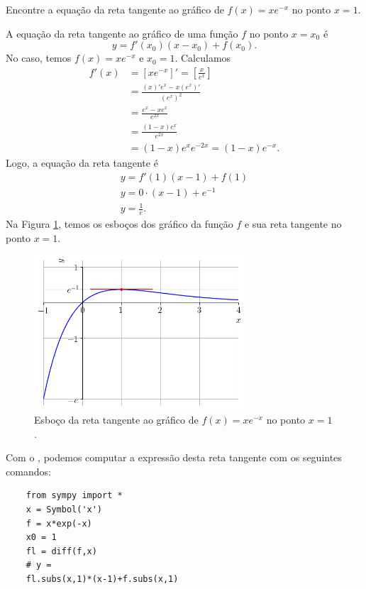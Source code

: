 \begin{exeresol}
  Encontre a equação da reta tangente ao gráfico de $f(x) = xe^{-x}$ no ponto $x=1$.
\end{exeresol}
\begin{resol}
  A equação da reta tangente ao gráfico de uma função $f$ no ponto $x=x_0$ é
  \begin{equation}
    y = f'(x_0)(x-x_0)+f(x_0).
  \end{equation}
  No caso, temos $f(x)=xe^{-x}$ e $x_0=1$. Calculamos
  \begin{align}
    f'(x) &= [xe^{-x}]' = \left[\frac{x}{e^x}\right] \\
          &= \frac{(x)'e^x-x(e^x)'}{(e^x)^2} \\
          &= \frac{e^x-xe^x}{e^{2x}} \\
          &= \frac{(1-x)e^x}{e^{2x}} \\
          &= (1-x)e^xe^{-2x} = (1-x)e^{-x}.
  \end{align}
  Logo, a equação da reta tangente é
  \begin{gather}
    y = f'(1)(x-1)+f(1) \\
    y = 0\cdot (x-1) + e^{-1} \\
    y = \frac{1}{e}.
  \end{gather}
  Na Figura \ref{fig:deriv_exeresol_rt_xe-x}, temos os esboços dos gráfico da função $f$ e sua reta tangente no ponto $x=1$.

  \begin{figure}[H]
    \centering
    \includegraphics[width=0.7\textwidth]{./cap_deriv/dados/fig_deriv_exeresol_rt_xe-x/fig}
    \caption{Esboço da reta tangente ao gráfico de $f(x)=xe^{-x}$ no ponto $x=1$.}
    \label{fig:deriv_exeresol_rt_xe-x}
  \end{figure}

  \ifispython
  Com o \sympy, podemos computar a expressão desta reta tangente com os seguintes comandos:
  \begin{lstlisting}
    from sympy import *
    x = Symbol('x')
    f = x*exp(-x)
    x0 = 1
    fl = diff(f,x)
    # y = 
    fl.subs(x,1)*(x-1)+f.subs(x,1)
  \end{lstlisting}
  \fi
\end{resol}

